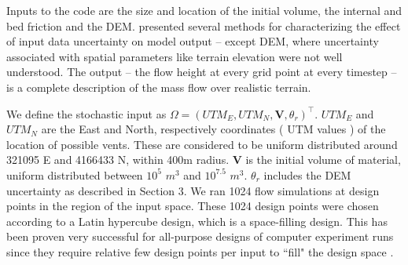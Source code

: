 \documentclass[12pt,letterpaper]{article}
\begin{document}
Inputs to the code are the size and location of the initial volume,
the internal and bed friction and the DEM. \citet{Keith} presented
several methods for characterizing the effect of input data
uncertainty on model output -- except DEM, where uncertainty associated 
with spatial parameters like terrain elevation were not well understood.
The output -- the flow height at every grid point
at every timestep -- is a complete description of the mass flow over realistic terrain.

We define the stochastic input as $\Omega = (UTM_E, UTM_N, \textbf{V}, \theta_r)^\top$. 
$UTM_E$ and $UTM_N$ are the East and North, respectively coordinates ( UTM values )
of the location of possible vents. These are considered to be uniform distributed around 
321095 E and 4166433 N, within 400m radius. \textbf{V} is the initial volume of material,
uniform distributed between $10^{5}$ $m^3$ and $10^{7.5}$ $m^3$. $\theta_r$ includes the DEM uncertainty as described 
in Section 3. We ran 1024 flow simulations at design points in the region of the input space. These 1024
design points were chosen according to a Latin hypercube design, which is a space-filling 
design. This has been proven very successful for all-purpose designs of computer experiment runs
since they require relative few design points per input to ``fill" the design space \citep{Sacks1989}. 
%
\end{document}
